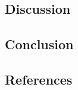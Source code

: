 \documentclass[journal=jacsat,manuscript=article]{achemso}
\begin{document}
\subsection{Discussion}

\subsection{Conclusion}

\subsection{References}







\end{document}
